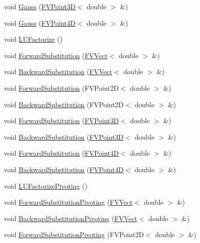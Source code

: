 \begin{DoxyCompactItemize}
void \hyperlink{classFVDenseM_a864f4adb3fe4e5c6d74daa5cedd3df7c}{Gauss} (\hyperlink{classFVPoint3D}{FVPoint3D}$<$ double $>$ \&)
\item 
void \hyperlink{classFVDenseM_a3c4182b71aecdfec9ad09371357718de}{Gauss} (\hyperlink{classFVPoint4D}{FVPoint4D}$<$ double $>$ \&)
\item 
void \hyperlink{classFVDenseM_af59b5802fb916dad62140d59f266dc5d}{LUFactorize} ()
\item 
void \hyperlink{classFVDenseM_a7f0e2f87410bc98b81e4b45bc93dc8c7}{ForwardSubstitution} (\hyperlink{classFVVect}{FVVect}$<$ double $>$ \&)
\item 
void \hyperlink{classFVDenseM_a3749badec5bcc0b96381564309b61f5c}{BackwardSubstitution} (\hyperlink{classFVVect}{FVVect}$<$ double $>$ \&)
\item 
void \hyperlink{classFVDenseM_a22fd244ada8027b00b4e8e719b12b98d}{ForwardSubstitution} (FVPoint2D$<$ double $>$ \&)
\item 
void \hyperlink{classFVDenseM_a7b446c084839b05d16f40bfc87d7240f}{BackwardSubstitution} (FVPoint2D$<$ double $>$ \&)
\item 
void \hyperlink{classFVDenseM_a9ccdde3331a8053bcb9d0ad20abd46bd}{ForwardSubstitution} (\hyperlink{classFVPoint3D}{FVPoint3D}$<$ double $>$ \&)
\item 
void \hyperlink{classFVDenseM_a7018eb739af43b8ff3b6d457437f29ab}{BackwardSubstitution} (\hyperlink{classFVPoint3D}{FVPoint3D}$<$ double $>$ \&)
\item 
void \hyperlink{classFVDenseM_aee73578def2da3a5cec6d63ca1dd16f7}{ForwardSubstitution} (\hyperlink{classFVPoint4D}{FVPoint4D}$<$ double $>$ \&)
\item 
void \hyperlink{classFVDenseM_ac04bef4f6b253ceba7f0a11d68d48d26}{BackwardSubstitution} (\hyperlink{classFVPoint4D}{FVPoint4D}$<$ double $>$ \&)
\item 
void \hyperlink{classFVDenseM_a14f7b6677261c452cf1d7b2e674df9a3}{LUFactorizePivoting} ()
\item 
void \hyperlink{classFVDenseM_a98ff2d70d8ac97a2d8c1a6a109285fb9}{ForwardSubstitutionPivoting} (\hyperlink{classFVVect}{FVVect}$<$ double $>$ \&)
\item 
void \hyperlink{classFVDenseM_afdda7cd3e2492739a87f026cf6ac55ea}{BackwardSubstitutionPivoting} (\hyperlink{classFVVect}{FVVect}$<$ double $>$ \&)
\item 
void \hyperlink{classFVDenseM_aa2d2bc1b0cb10097d02a1d41ea963d56}{ForwardSubstitutionPivoting} (FVPoint2D$<$ double $>$ \&)
\item 

\end{DoxyCompactItemize}
